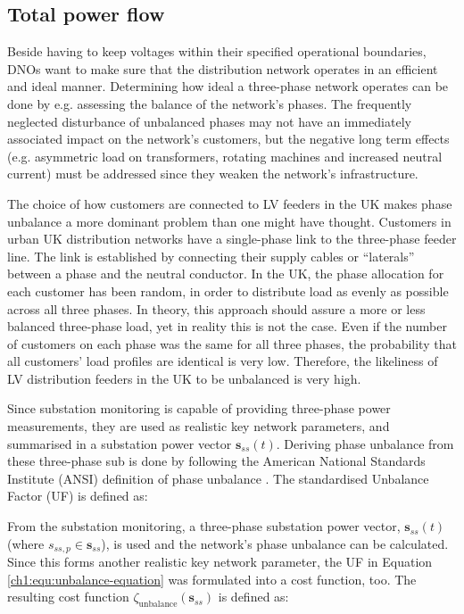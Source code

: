 

\subsection{Total power flow}
\label{ch1:subsec:total-power-flow}

Beside having to keep voltages within their specified operational boundaries, DNOs want to make sure that the distribution network operates in an efficient and ideal manner.
Determining how ideal a three-phase network operates can be done by e.g. assessing the balance of the network's phases.
The frequently neglected disturbance of unbalanced phases may not have an immediately associated impact on the network's customers, but the negative long term effects (e.g. asymmetric load on transformers, rotating machines and increased neutral current) must be addressed since they weaken the network's infrastructure.

The choice of how customers are connected to LV feeders in the UK makes phase unbalance a more dominant problem than one might have thought.
Customers in urban UK distribution networks have a single-phase link to the three-phase feeder line.
The link is established by connecting their supply cables or ``laterals'' between a phase and the neutral conductor.
In the UK, the phase allocation for each customer has been random, in order to distribute load as evenly as possible across all three phases.
In theory, this approach should assure a more or less balanced three-phase load, yet in reality this is not the case.
Even if the number of customers on each phase was the same for all three phases, the probability that all customers' load profiles are identical is very low.
Therefore, the likeliness of LV distribution feeders in the UK to be unbalanced is very high.

Since substation monitoring is capable of providing three-phase power measurements, they are used as realistic key network parameters, and summarised in a substation power vector $\textbf{s}_{ss}(t)$.
Deriving phase unbalance from these three-phase sub is done by following the American National Standards Institute (ANSI) definition of phase unbalance \cite{ANSI-MB-1-2011}.
The standardised Unbalance Factor (UF) is defined as:



From the substation monitoring, a three-phase substation power vector, $\textbf{s}_{ss}(t)$ (where $s_{ss,p} \in \textbf{s}_{ss}$), is used and the network's phase unbalance can be calculated.
Since this forms another realistic key network parameter, the UF in Equation \ref{ch1:equ:unbalance-equation} was formulated into a cost function, too.
The resulting cost function $\zeta_\text{unbalance}(\textbf{s}_{ss})$ is defined as:

